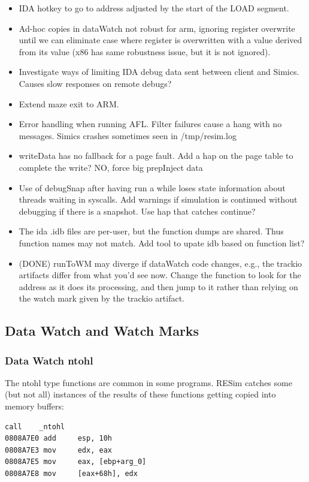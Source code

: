 \documentclass[titlepage]{article}
\begin{document}
\begin{appendices}
\begin{itemize}
\item IDA hotkey to go to address adjusted by the start of the LOAD segment.

\item Ad-hoc copies in dataWatch not robust for arm, ignoring register overwrite until we can eliminate case where register is overwritten
with a value derived from its value (x86 has same robustness issue, but it is not ignored).

\item Investigate ways of limiting IDA debug data sent between client and Simics.  Causes slow responses on remote debugs?

\item Extend maze exit to ARM.

\item Error handling when running AFL.  Filter failures cause a hang with no messages.  Simics crashes sometimes seen in /tmp/resim.log

\item writeData has no fallback for a page fault.  Add a hap on the page table to complete the write?  NO, force big prepInject data

\item Use of debugSnap after having run a while loses state information about threads waiting in syscalls.  Add warnings if simulation is
continued without debugging if there is a snapshot.  Use hap that catches continue?

\item The ida .idb files are per-user, but the function dumps are shared.  Thus function names may not match.  Add tool to upate idb based
on function list?

\item (DONE) runToWM may diverge if dataWatch code changes, e.g., the trackio artifacts differ from what you'd see now.  Change the function to
look for the address as it does its processing, and then jump to it rather than relying on the watch mark  given by the trackio artifact.
\end{itemize}

\subsection{Data Watch and Watch Marks}
\subsubsection{Data Watch ntohl}
The ntohl type functions are common in some programs.  RESim catches some (but not all) instances of the results of these functions getting copied into memory buffers:
\begin{verbatim}
call    _ntohl
0808A7E0 add     esp, 10h
0808A7E3 mov     edx, eax
0808A7E5 mov     eax, [ebp+arg_0]
0808A7E8 mov     [eax+68h], edx
\end{verbatim}


\end{appendices}
\end{document}
